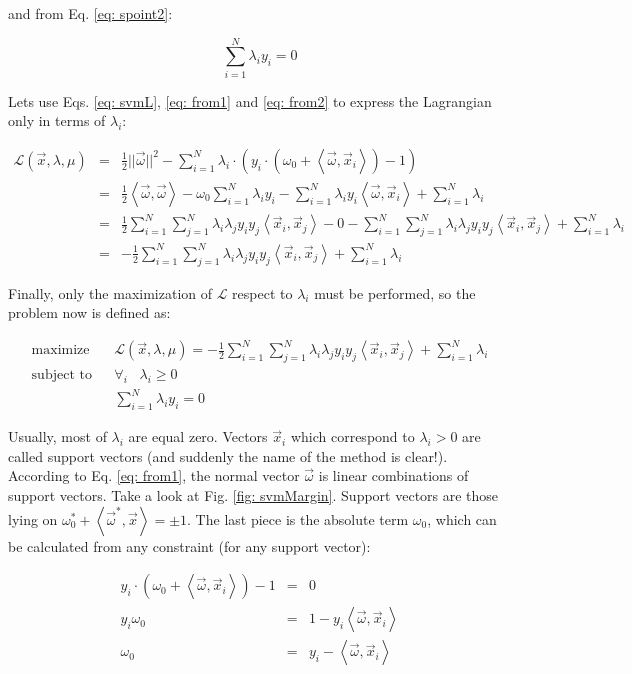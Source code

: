 and from Eq. \ref{eq: spoint2}:

\begin{equation}
 \sum_{i=1}^{N} \lambda_iy_i = 0
 \label{eq: from2}
\end{equation}

Lets use Eqs. \ref{eq: svmL}, \ref{eq: from1} and \ref{eq: from2} to express the Lagrangian only in terms of $\lambda_i$:

\begin{eqnarray}
  \mathcal{L} (\vec x, \lambda, \mu) & = & \frac{1}{2}||\vec\omega||^2 - \sum_{i=1}^N \lambda_i \cdot \left(y_i \cdot \left(\omega_0 + \left<\vec\omega, \vec x_i\right>\right) - 1\right) \\ \nonumber
  & = & \frac{1}{2}\left<\vec\omega, \vec\omega\right> - \omega_0 \sum_{i=1}^N \lambda_iy_i - \sum_{i=1}^N\lambda_iy_i\left<\vec\omega, \vec x_i\right> + \sum_{i=1}^{N}\lambda_i \\ \nonumber
  & = & \frac{1}{2}\sum_{i=1}^N\sum_{j=1}^N\lambda_i\lambda_jy_iy_j\left<\vec x_i, \vec x_j\right> - 0 - \sum_{i=1}^N\sum_{j=1}^N\lambda_i\lambda_jy_iy_j\left<\vec x_i, \vec x_j\right> + \sum_{i=1}^{N}\lambda_i \\ \nonumber
  & = & -\frac{1}{2}\sum_{i=1}^N\sum_{j=1}^N\lambda_i\lambda_jy_iy_j\left<\vec x_i, \vec x_j\right> + \sum_{i=1}^{N}\lambda_i
\end{eqnarray}

Finally, only the maximization of $\mathcal{L}$ respect to $\lambda_i$ must be performed, so the problem now is defined as:

\begin{eqnarray}
 \text{maximize} & & \mathcal{L} (\vec x, \lambda, \mu) = -\frac{1}{2}\sum_{i=1}^N\sum_{j=1}^N\lambda_i\lambda_jy_iy_j\left<\vec x_i, \vec x_j\right> + \sum_{i=1}^{N}\lambda_i \\ \nonumber
 \text{subject to} & & \forall_i \hspace{10pt} \lambda_i \geq 0 \\ \nonumber
 \text{} & & \sum_{i=1}^{N} \lambda_iy_i = 0
 \label{eq: optimizationLM}
\end{eqnarray}

Usually, most of $\lambda_i$ are equal zero. Vectors $\vec x_i$ which correspond to $\lambda_i > 0$ are called support vectors (and suddenly the name of the method is clear!). According to Eq. \ref{eq: from1}, the normal vector $\vec\omega$ is linear combinations of support vectors. Take a look at Fig. \ref{fig: svmMargin}. Support vectors are those lying on $\omega_0^* + \left<\vec\omega^*, \vec x\right> = \pm 1$. The last piece is the absolute term $\omega_0$, which can be calculated from any constraint (for any support vector):

\begin{eqnarray}
 y_i \cdot \left(\omega_0 + \left<\vec\omega, \vec x_i\right>\right) - 1 & = & 0 \\ \nonumber
 y_i\omega_0 & = & 1 - y_i \left<\vec\omega, \vec x_i\right> \\ \nonumber
 \omega_0 & = & y_i - \left<\vec\omega, \vec x_i\right>
\end{eqnarray}

